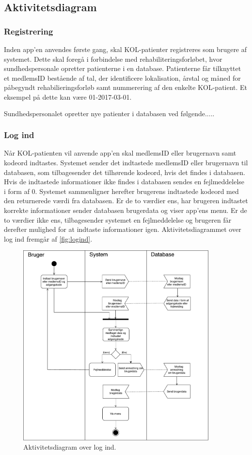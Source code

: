 \subsection{Aktivitetsdiagram}


\subsubsection{Registrering}
Inden app'en anvendes første gang, skal KOL-patienter registreres som brugere af systemet. Dette skal foregå i forbindelse med rehabiliteringsforløbet, hvor sundhedspersonale opretter patienterne i en database. Patienterne får tilknyttet et medlemsID bestående af tal, der identificere lokalisation, årstal og måned for påbegyndt rehabilieringsforløb samt nummerering af den enkelte KOL-patient. Et eksempel på dette kan være 01-2017-03-01. 

Sundhedspersonalet opretter nye patienter i databasen ved følgende.....

\subsubsection{Log ind}
Når KOL-patienten vil anvende app'en skal medlemsID eller brugernavn samt kodeord indtastes. Systemet sender det indtastede medlemsID eller brugernavn til databasen, som tilbagesender det tilhørende kodeord, hvis det findes i databasen. Hvis de indtastede informationer ikke findes i databasen sendes en fejlmeddelelse i form af 0. Systemet sammenligner herefter brugerens indtastede kodeord med den returnerede værdi fra databasen. Er de to værdier ens, har brugeren indtastet korrekte informationer sender databasen brugerdata og viser app'ens menu. Er de to værdier ikke ens, tilbagesender systemet en fejlmeddelelse og brugeren får derefter mulighed for at indtaste informationer igen. Aktivitetsdiagrammet over log ind fremgår af  \autoref{fig:logind}.

\begin{figure} [H]
\centering
\includegraphics[width=0.9\textwidth]{figures/aktivitetsdiagram/Logind}
\caption{Aktivitetsdiagram over log ind.}
\label{fig:Logind}
\end{figure}



